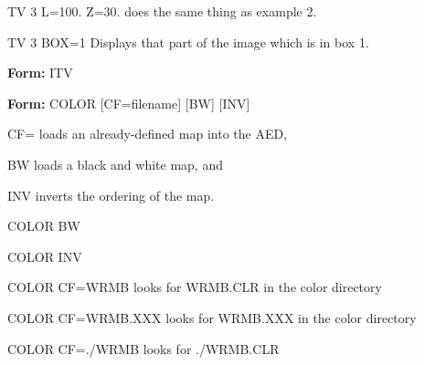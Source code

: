 {\newpage\clearpage
{}%
\begin{example}
  \item[{TV 3 L=100. Z=30.\hfill}]{does the same thing as example 2.}
\end{example}%
\lthtmlfigureZ
\lthtmlcheckvsize\clearpage}

{\newpage\clearpage
{}%
\begin{example}
  \item[{TV 3 BOX=1\hfill}]{Displays that part of the image
       which is in box 1.}
\end{example}%
\lthtmlfigureZ
\lthtmlcheckvsize\clearpage}

{\newpage\clearpage
{}%
\begin{command}
  \item[\textbf{Form: }ITV\hfill]{}
\end{command}%
\lthtmlfigureZ
\lthtmlcheckvsize\clearpage}

{\newpage\clearpage
{}%
\begin{command}
  \item[\textbf{Form: }COLOR {[CF=filename]} {[BW]} {[INV]}\hfill]{}
  \item[CF=]{loads an already-defined map into the AED,}
  \item[BW]{loads a black and white map, and}
  \item[INV]{inverts the ordering of the map.}
\end{command}%
\lthtmlfigureZ
\lthtmlcheckvsize\clearpage}

{\newpage\clearpage
{}%
\begin{hanging}
  \item{COLOR BW}
\end{hanging}%
\lthtmlfigureZ
\lthtmlcheckvsize\clearpage}

{\newpage\clearpage
{}%
\begin{hanging}
  \item{COLOR INV}
\end{hanging}%
\lthtmlfigureZ
\lthtmlcheckvsize\clearpage}

{\newpage\clearpage
{}%
\begin{example}
  \item[COLOR CF=WRMB\hfill]{looks for WRMB.CLR in the color directory}
  \item[COLOR CF=WRMB.XXX\hfill]{looks for WRMB.XXX in the color directory}
  \item[COLOR CF=./WRMB\hfill]{looks for ./WRMB.CLR}
\end{example}%
\lthtmlfigureZ
\lthtmlcheckvsize\clearpage}

